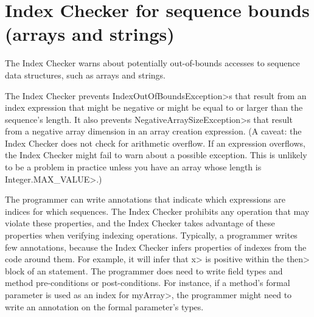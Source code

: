 \chapter{Index Checker for sequence bounds (arrays and strings)\label{index-checker}}

The Index Checker warns about potentially out-of-bounds accesses to sequence
data structures, such as arrays
and strings.

The Index Checker prevents \<IndexOutOfBoundsException>s that result from
an index expression that might be negative or might be equal to or larger
than the sequence's length.
It also prevents \<NegativeArraySizeException>s that result from a negative
array dimension in an array creation expression.
(A caveat: the Index Checker does not check for arithmetic overflow. If
an expression overflows, the Index Checker might fail to warn about a
possible exception.  This is unlikely to be a problem in practice unless
you have an array whose length is \<Integer.MAX\_VALUE>.)

%

The programmer can write annotations that indicate which expressions are
indices for which sequences.  The Index Checker prohibits any operation that
may violate these properties, and the Index Checker takes advantage of
these properties when verifying indexing operations.
%
Typically, a programmer writes few annotations, because the Index Checker
infers properties of indexes from
the code around them. For example, it will infer that \<x> is positive
within the \<then> block of an  statement.
The programmer does need to write field types and method pre-conditions or post-conditions. For instance,
if a method's formal parameter is used as an index for
\<myArray>, the programmer might need to
write an 
annotation on the formal parameter's types.

